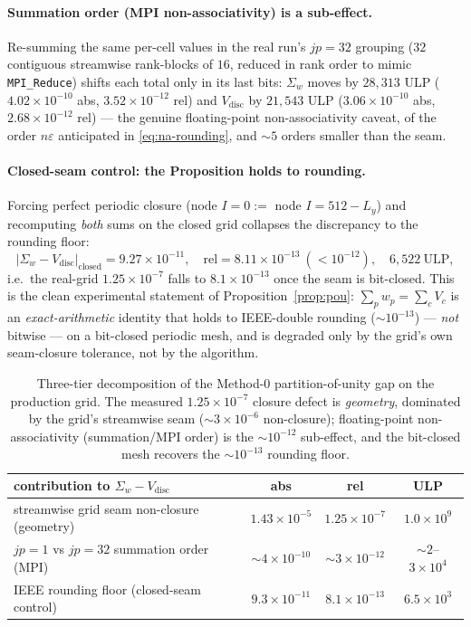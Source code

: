 \documentclass[11pt]{article}
\theoremstyle{definition}
\theoremstyle{remark}
\begin{document}
\paragraph{Summation order (MPI non-associativity) is a sub-effect.}
Re-summing the same per-cell values in the real run's $jp{=}32$ grouping ($32$
contiguous streamwise rank-blocks of $16$, reduced in rank order to mimic
\texttt{MPI\_Reduce}) shifts each total only in its last bits:
$\Sigma_w$ moves by $28{,}313$ ULP ($4.02\times10^{-10}$ abs,
$3.52\times10^{-12}$ rel) and $V_{\mathrm{disc}}$ by $21{,}543$ ULP
($3.06\times10^{-10}$ abs, $2.68\times10^{-12}$ rel) --- the genuine
floating-point non-associativity caveat, of the order $n\varepsilon$ anticipated
in \eqref{eq:na-rounding}, and $\sim\!5$ orders smaller than the seam.

\paragraph{Closed-seam control: the Proposition holds to rounding.}
Forcing perfect periodic closure (node $I{=}0:=$ node $I{=}512-L_y$) and
recomputing \emph{both} sums on the closed grid collapses the discrepancy to the
rounding floor:
\[
|\Sigma_w-V_{\mathrm{disc}}|_{\text{closed}} = 9.27\times10^{-11},\quad
\text{rel}=8.11\times10^{-13}\ (<10^{-12}),\quad 6{,}522\ \text{ULP},
\]
i.e.\ the real-grid $1.25\times10^{-7}$ falls to $8.1\times10^{-13}$ once the seam
is bit-closed. This is the clean experimental statement of
Proposition~\ref{prop:pou}: $\sum_p w_p=\sum_c V_c$ is an \emph{exact-arithmetic}
identity that holds to IEEE-double rounding ($\sim\!10^{-13}$) --- \emph{not}
bitwise --- on a bit-closed periodic mesh, and is degraded only by the grid's own
seam-closure tolerance, not by the algorithm.

\begin{table}[t]
\centering
\small
\begin{tabular}{lccc}
\toprule
contribution to $\Sigma_w-V_{\mathrm{disc}}$ & abs & rel & ULP \\
\midrule
streamwise grid seam non-closure (geometry) & $1.43\times10^{-5}$ & $1.25\times10^{-7}$ & $1.0\times10^{9}$ \\
$jp{=}1$ vs $jp{=}32$ summation order (MPI)  & $\sim\!4\times10^{-10}$ & $\sim\!3\times10^{-12}$ & $\sim\!2$--$3\times10^{4}$ \\
IEEE rounding floor (closed-seam control)    & $9.3\times10^{-11}$ & $8.1\times10^{-13}$ & $6.5\times10^{3}$ \\
\bottomrule
\end{tabular}
\caption{Three-tier decomposition of the Method-0 partition-of-unity gap on the
production grid. The measured $1.25\times10^{-7}$ closure defect is
\emph{geometry}, dominated by the grid's streamwise seam ($\sim\!3\times10^{-6}$
non-closure); floating-point non-associativity (summation/MPI order) is the
$\sim\!10^{-12}$ sub-effect, and the bit-closed mesh recovers the
$\sim\!10^{-13}$ rounding floor.}
\label{tab:E4-tiers}
\end{table}
\end{document}
